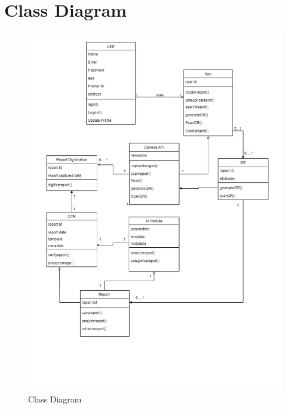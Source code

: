 \section{Class Diagram}
\begin{figure}[h]
    \centering
    \includegraphics[width=130mm]{figures/classdiagram.jpg}
    \caption{Class Diagram}
\end{figure}
\newpage
